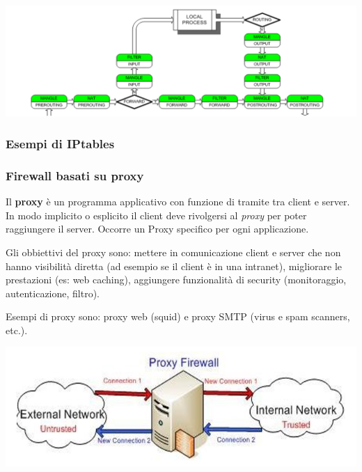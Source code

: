             \begin{center}
                \includegraphics[scale=0.32]{chapters/7/assets/schema_d.png}
            \end{center}

            \subsubsection*{Esempi di IPtables}

            

        \subsubsection{Firewall basati su proxy}
            Il \textbf{proxy} è un programma applicativo con funzione di tramite tra client e server. In modo implicito o esplicito il client deve rivolgersi al \textit{proxy} per poter raggiungere il server. Occorre un Proxy specifico per ogni applicazione.
        
            Gli obbiettivi del proxy sono: mettere in comunicazione client e server che non hanno visibilità diretta (ad esempio se il client è in una intranet), migliorare le prestazioni (es: web caching), aggiungere funzionalità di security (monitoraggio, autenticazione, filtro).
        
            Esempi di proxy sono: proxy web (squid) e proxy SMTP (virus e spam scanners, etc.).

            \begin{center}
                \includegraphics[scale=0.5]{chapters/7/assets/schema_f.png}
            \end{center}

